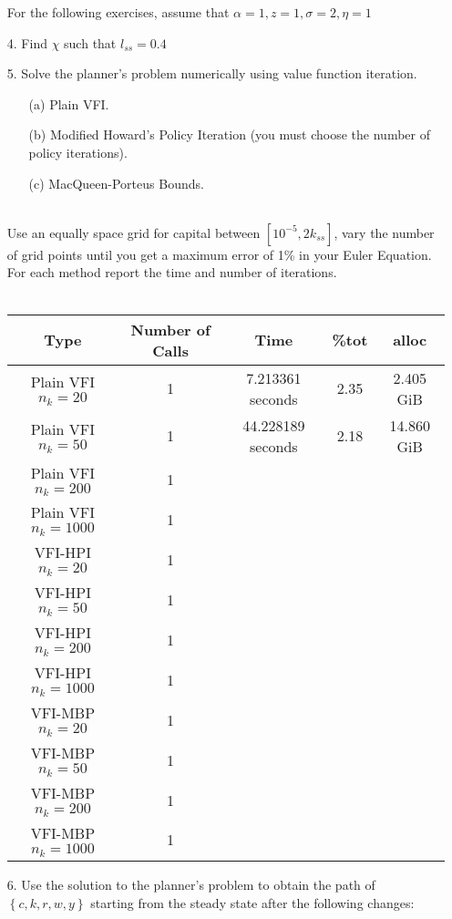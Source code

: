 \documentclass[a4paper]{article}
\begin{document}
\begin{enumerate}
For the  following exercises, assume that $\alpha=1, z=1, \sigma=2, \eta = 1$
\item[4.] Find $\chi$ such that $l_{ss} = 0.4$
\item[5.] Solve the planner's problem numerically using value function iteration.
\begin{enumerate}
\item[(a)] Plain VFI.
\item[(b)] Modified Howard’s Policy Iteration (you must choose the number of policy iterations).
\item[(c)] MacQueen-Porteus Bounds.\\~\
\end{enumerate}

Use an equally space grid for capital between $[10^{-5}, 2k_{ss}]$, vary the number of grid points until you get a maximum error of 1\% in your Euler Equation. For each method report the time and number of iterations.\\~\

\begin{table}[htbp]
\centering
\begin{tabular}{|ccccc|}
\hline
Type & Number of Calls & Time & \%tot & alloc \\
\hline
Plain VFI $n_k=20$ & 1 & 7.213361 seconds  & 2.35 & 2.405 GiB\\
Plain VFI $n_k=50$ & 1 &  44.228189 seconds&  2.18 & 14.860 GiB \\
Plain VFI $n_k=200$ & 1 &  &  &  \\
Plain VFI $n_k=1000$ &1  &  &  &  \\
VFI-HPI $n_k=20$ & 1 &  &  &  \\
VFI-HPI $n_k=50$& 1 &  &  &  \\
VFI-HPI $n_k=200$& 1 &  &  &  \\
VFI-HPI $n_k=1000$&  1&  &  &  \\
VFI-MBP  $n_k=20$ &  1&  &  &  \\
VFI-MBP $n_k=50$& 1 &  &  &  \\
VFI-MBP $n_k=200$& 1 &  &  &  \\
VFI-MBP $n_k=1000$&  1&  &  & 
\end{tabular}
\end{table}

\item[6.] Use the solution to the planner’s problem to obtain the path of $\left\lbrace c, k, r, w, y \right\rbrace$ starting from the steady state after the following changes: \\~\


\end{enumerate}
\end{document}
